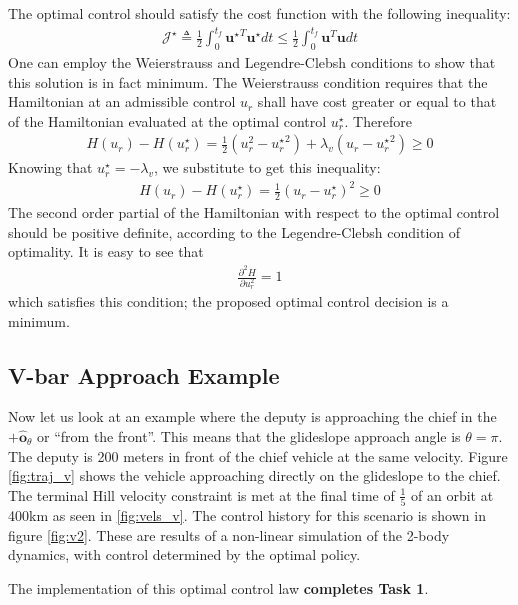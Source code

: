 \documentclass[conf]{new-aiaa}
\begin{document}
\begin{singlespace}
The optimal control should satisfy the cost function with the following inequality:
\begin{align}
    \mathcal{J}^\star \triangleq \frac{1}{2}\int_0^{t_f} {\bm{u}^\star}^T \bm{u}^\star dt \leq  \frac{1}{2}\int_0^{t_f} {\bm{u}}^T \bm{u} dt
\end{align}
One can employ the Weierstrauss and Legendre-Clebsh conditions to show that this solution is in fact minimum. The Weierstrauss condition requires that the Hamiltonian at an admissible control $u_r$ shall have cost greater or equal to that of the Hamiltonian evaluated at the optimal control $u_r^\star$. Therefore
\begin{align}
    H(u_r) - H(u_r^\star)= \frac{1}{2}(u_r^2 - {u_r^\star}^2) + \lambda_v(u_r -  {u_r^\star}^2) \geq 0
\end{align}
Knowing that $ u_r^\star = -\lambda_v $, we substitute to get this inequality:
\begin{align}
    H(u_r) - H(u_r^\star)= \frac{1}{2}(u_r - {u_r^\star})^2 \geq 0
\end{align}
The second order partial of the Hamiltonian with respect to the optimal control should be positive definite, according to the Legendre-Clebsh condition of optimality. It is easy to see that
\begin{align}
    \frac{\partial^2 H}{\partial u_r^2} = 1
\end{align}
which satisfies this condition; the proposed optimal control decision is a minimum.


\subsection{V-bar Approach Example}
Now let us look at an example where the deputy is approaching the chief in the $+\bm{\hat{o}}_\theta$ or ``from the front''. This means that the glideslope approach angle is $\theta = \pi$. The deputy is 200 meters in front of the chief vehicle at the same velocity. Figure \ref{fig:traj_v} shows the vehicle approaching directly on the glideslope to the chief. The terminal Hill velocity constraint is met at the final time of $\frac{1}{5}$ of an orbit at 400km as seen in \ref{fig:vels_v}. The control history for this scenario is shown in figure \ref{fig:v2}. These are results of a non-linear simulation of the 2-body dynamics, with control determined by the optimal policy.

The implementation of this optimal control law \textbf{completes Task 1}.


\end{singlespace}
\end{document}
